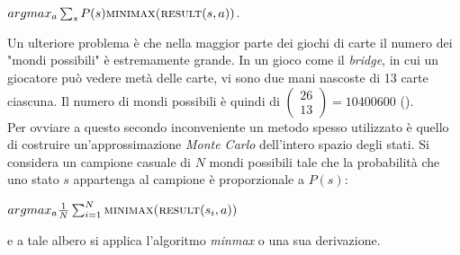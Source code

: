 \begin{center}
$ argmax_a \sum_{s} P(s) \textsc{minimax(result}(s,a)) $.\\
\end{center}
Un ulteriore problema è che nella maggior parte dei giochi di carte il numero dei "mondi possibili" è estremamente grande.
In un gioco come il \emph{bridge}, in cui un giocatore può vedere metà delle carte, vi sono due mani nascoste di 13 carte ciascuna.
Il numero di mondi possibili è quindi di $ \left(\! \begin{array}{c} 26 \\  13\end{array}\!\right)  = 10 400 600 $ (\cite{randw}).\\
Per ovviare a questo secondo inconveniente un metodo spesso utilizzato è quello di costruire un'approssimazione \emph{Monte Carlo} dell'intero spazio degli stati.
Si considera un campione casuale di $N$ mondi possibili tale che la probabilità che uno stato $s$ appartenga al campione è proporzionale a $P(s)$:

\begin{center}
$argmax_a \frac{1}{N} \sum_{i=1}^{N}  \textsc{minimax(result}(s_i,a)) $ \cite{randw}\\
\end{center}
e a tale albero si applica l'algoritmo \emph{minmax} o una sua derivazione.
